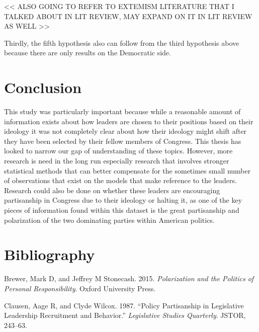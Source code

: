 \documentclass[12pt,twoside]{reedthesis}
\begin{document}
  \textless{}\textless{} ALSO GOING TO REFER TO EXTEMISM LITERATURE THAT I
  TALKED ABOUT IN LIT REVIEW, MAY EXPAND ON IT IN LIT REVIEW AS WELL
  \textgreater{}\textgreater{}
  
  Thirdly, the fifth hypothesis also can follow from the third hypothesis
  above because there are only results on the Democratic side.
  
  \chapter*{Conclusion}\label{conclusion-1}
  
  \setcounter{chapter}{4} \setcounter{section}{0}
  
  This study was particularly important because while a reasonable amount
  of information exists about how leaders are chosen to their positions
  based on their ideology it was not completely clear about how their
  ideology might shift after they have been selected by their fellow
  members of Congress. This thesis has looked to narrow our gap of
  understanding of these topics. However, more research is need in the
  long run especially research that involves stronger statistical methods
  that can better compensate for the sometimes small number of
  observations that exist on the models that make reference to the
  leaders. Research could also be done on whether these leaders are
  encouraging partisanship in Congress due to their ideology or halting
  it, as one of the key pieces of information found within this dataset is
  the great partisanship and polarization of the two dominating parties
  within American politics.
  
  \backmatter
  
  \chapter{Bibliography}\label{bibliography}
  
  \noindent
  
  \setlength{\parindent}{-0.20in} \setlength{\leftskip}{0.20in}
  \setlength{\parskip}{8pt}
  
  \hypertarget{refs}{}
  \hypertarget{ref-Brewer2015}{}
  Brewer, Mark D, and Jeffrey M Stonecash. 2015. \emph{Polarization and
  the Politics of Personal Responsibility}. Oxford University Press.
  
  \hypertarget{ref-Clausen1987}{}
  Clausen, Aage R, and Clyde Wilcox. 1987. ``Policy Partisanship in
  Legislative Leadership Recruitment and Behavior.'' \emph{Legislative
  Studies Quarterly}. JSTOR, 243--63.
  
\end{document}
